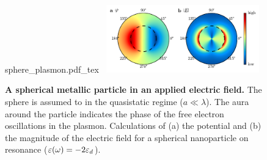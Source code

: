 \documentclass{article}
\begin{document}
\begin{figure}[bt]
\centering
\fontsize{10pt}{1em}\selectfont
\def\svgwidth{0.35\textwidth}
{sphere_plasmon.pdf_tex}
~\includegraphics[width=0.59\textwidth]{figures/spherical_np_dipole_lsp}
\caption[A spherical metallic particle in an applied electric field]{\textbf{A spherical metallic particle in an applied electric field.} The sphere is assumed to in the quasistatic regime ($a\ll\lambda$). The aura around the particle indicates the phase of the free electron oscillations in the plasmon. Calculations of (a) the potential and (b) the magnitude of the electric field for a spherical nanoparticle on resonance ($\varepsilon(\omega)=-2\varepsilon_d$).}
\label{fig:sphere_plasmon}
\end{figure}
\end{document}

